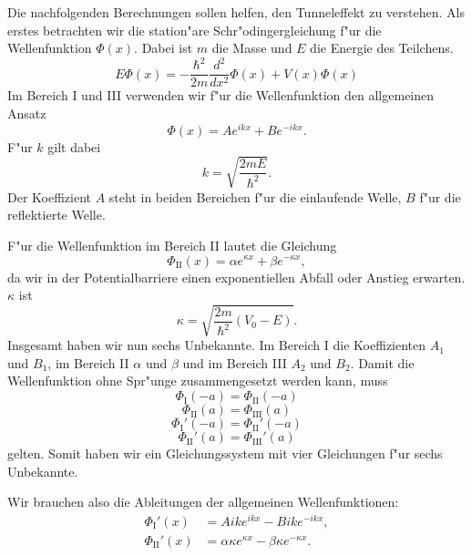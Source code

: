 \begin{refsection}
Die nachfolgenden Berechnungen sollen helfen, den Tunneleffekt zu verstehen.  
Als erstes betrachten wir die station"are Schr"odingergleichung f"ur die Wellenfunktion $\Phi(x)$. 
Dabei ist $m$ die Masse und $E$ die Energie des Teilchens.
\[
E\Phi(x) = -\frac{\hbar^2}{2m}\frac{d^2}{dx^2}\Phi(x) + V(x)\Phi(x)
\]
Im Bereich \textrm{I} und \textrm{III} verwenden wir f"ur die Wellenfunktion den allgemeinen Ansatz
\[
\Phi(x) = Ae^{ikx}+Be^{-ikx}.
\]
F"ur $k$ gilt dabei
\[
k = \sqrt{\frac{2mE}{\hbar^2}}.
\]
Der Koeffizient $A$ steht in beiden Bereichen f"ur die einlaufende Welle, $B$ f"ur die reflektierte Welle.

F"ur die Wellenfunktion im Bereich \textrm{II} lautet die Gleichung
\[
\Phi_\text{II}(x) = \alpha e^{\kappa x} + \beta e^{-\kappa x},
\]
da wir in der Potentialbarriere einen exponentiellen Abfall oder Anstieg erwarten. 
$\kappa$ ist
\[
\kappa = \sqrt{\frac{2m}{\hbar^2}(V_0 - E)}.
\]
Insgesamt haben wir nun sechs Unbekannte. 
Im Bereich \textrm{I} die Koeffizienten $A_1$ und $B_1$, im Bereich \textrm{II} $\alpha$ und $\beta$ und im Bereich \textrm{III} $A_2$ und $B_2$. 
Damit die Wellenfunktion ohne Spr"unge zusammengesetzt werden kann, muss
\begin{equation}
\Phi_\text{I}(-a) = \Phi_\text{II}(-a)
\label{tunnel:fktwert-a}
\end{equation}
\begin{equation}
\Phi_\text{II}(a) = \Phi_\text{III}(a)
\label{tunnel:fktwerta}
\end{equation}
\begin{equation}
\Phi_\text{I}'(-a) = \Phi_\text{II}'(-a)
\label{tunnel:steigung-a}
\end{equation}
\begin{equation}
\Phi_\text{II}'(a) = \Phi_\text{III}'(a)
\label{tunnel:steigunga}
\end{equation}
gelten.
Somit haben wir ein Gleichungssystem mit vier Gleichungen f"ur sechs Unbekannte.

Wir brauchen also die Ableitungen der allgemeinen Wellenfunktionen:
\begin{align*}
\Phi_\text{I}'(x) &= Aike^{ikx} - Bike^{-ikx},
\\
\Phi_\text{II}'(x) &= \alpha \kappa e^{\kappa x} - \beta \kappa e^{-\kappa x}.
\end{align*}


\end{refsection}
